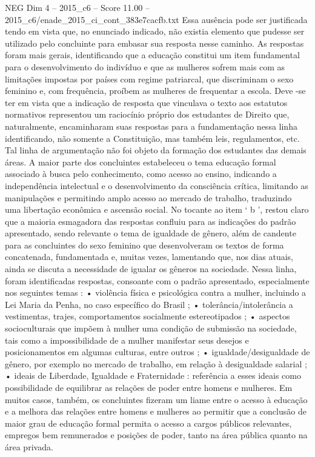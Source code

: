 \begin{textsample}{NEG Dim 4 – 2015\_c6 – Score 11.00 – 2015\_c6/enade\_2015\_ci\_cont\_383e7cacfb.txt}
Essa ausência pode ser justificada tendo em vista que, no enunciado indicado, não existia elemento que pudesse ser utilizado pelo concluinte para embasar sua resposta nesse caminho.
As respostas foram mais gerais, identificando que a educação constitui um item fundamental para o desenvolvimento do indivíduo e que as mulheres sofrem mais com as limitações impostas por países com regime patriarcal, que discriminam o sexo feminino e, com frequência, proíbem as mulheres de frequentar a escola.
Deve -se ter em vista que a indicação de resposta que vinculava o texto aos estatutos normativos representou um raciocínio próprio dos estudantes de Direito que, naturalmente, encaminharam suas respostas para a fundamentação nessa linha identificando, não somente a Constituição, mas também leis, regulamentos, etc.
Tal linha de argumentação não foi objeto da formação dos estudantes das demais áreas.
A maior parte dos concluintes estabeleceu o tema educação formal associado à busca pelo conhecimento, como acesso ao ensino, indicando a independência intelectual e o desenvolvimento da consciência crítica, limitando as manipulações e permitindo amplo acesso ao mercado de trabalho, traduzindo uma libertação econômica e ascensão social.
No tocante ao item ‘ b ’, restou claro que a maioria esmagadora das respostas confluiu para as indicações do padrão apresentado, sendo relevante o tema de igualdade de gênero, além de candente para as concluintes do sexo feminino que desenvolveram os textos de forma concatenada, fundamentada e, muitas vezes, lamentando que, nos dias atuais, ainda se discuta a necessidade de igualar os gêneros na sociedade.
Nessa linha, foram identificadas respostas, consoante com o padrão apresentado, especialmente nos seguintes temas : • violência física e psicológica contra a mulher, incluindo a Lei Maria da Penha, no caso específico do Brasil ; • tolerância/intolerância a vestimentas, trajes, comportamentos socialmente estereotipados ; • aspectos socioculturais que impõem à mulher uma condição de submissão na sociedade, tais como a impossibilidade de a mulher manifestar seus desejos e posicionamentos em algumas culturas, entre outros ; • igualdade/desigualdade de gênero, por exemplo no mercado de trabalho, em relação à desigualdade salarial ; • ideais de Liberdade, Igualdade e Fraternidade : referência a esses ideais como possibilidade de equilibrar as relações de poder entre homens e mulheres.
Em muitos casos, também, os concluintes fizeram um liame entre o acesso à educação e a melhora das relações entre homens e mulheres ao permitir que a conclusão de maior grau de educação formal permita o acesso a cargos públicos relevantes, empregos bem remunerados e posições de poder, tanto na área pública quanto na área privada.

\end{textsample}
